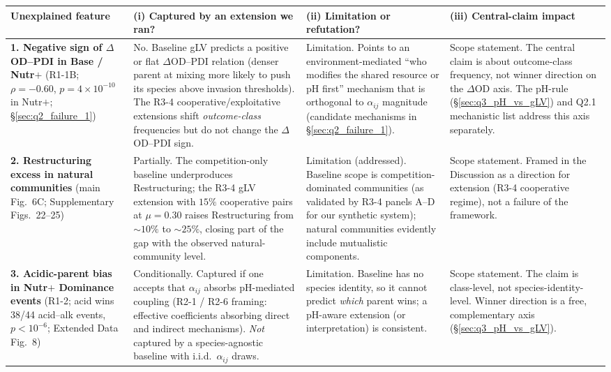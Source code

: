 \documentclass[11pt]{article}
\begin{document}
\begin{center}
\small
\begin{tabular}{p{} p{} p{} p{}}
\toprule
\textbf{Unexplained feature} & \textbf{(i) Captured by an extension we ran?} & \textbf{(ii) Limitation or refutation?} & \textbf{(iii) Central-claim impact} \\
\midrule
\textbf{1. Negative sign of $\Delta$OD--PDI in Base / Nutr$+$} \newline (R1-1B; $\rho = -0.60$, $p = 4 \times 10^{-10}$ in Nutr$+$; \S\ref{sec:q2_failure_1}) &
No. Baseline gLV predicts a positive or flat $\Delta$OD--PDI relation (denser parent at mixing more likely to push its species above invasion thresholds). The R3-4 cooperative/exploitative extensions shift \emph{outcome-class} frequencies but do not change the $\Delta$OD--PDI sign. &
Limitation. Points to an environment-mediated ``who modifies the shared resource or pH first'' mechanism that is orthogonal to $\alpha_{ij}$ magnitude (candidate mechanisms in \S\ref{sec:q2_failure_1}). &
Scope statement. The central claim is about outcome-class frequency, not winner direction on the $\Delta$OD axis. The pH-rule (\S\ref{sec:q3_pH_vs_gLV}) and Q2.1 mechanistic list address this axis separately. \\

\textbf{2. Restructuring excess in natural communities} \newline (main Fig.~6C; Supplementary Figs.~22--25) &
Partially. The competition-only baseline underproduces Restructuring; the R3-4 gLV extension with $15\%$ cooperative pairs at $\mu = 0.30$ raises Restructuring from $\sim 10\%$ to $\sim 25\%$, closing part of the gap with the observed natural-community level. &
Limitation (addressed). Baseline scope is competition-dominated communities (as validated by R3-4 panels A--D for our synthetic system); natural communities evidently include mutualistic components. &
Scope statement. Framed in the Discussion as a direction for extension (R3-4 cooperative regime), not a failure of the framework. \\

\textbf{3. Acidic-parent bias in Nutr$+$ Dominance events} \newline (R1-2; acid wins 38/44 acid--alk events, $p < 10^{-6}$; Extended Data Fig.~8) &
Conditionally. Captured if one accepts that $\alpha_{ij}$ absorbs pH-mediated coupling (R2-1 / R2-6 framing: effective coefficients absorbing direct and indirect mechanisms). \emph{Not} captured by a species-agnostic baseline with i.i.d.\ $\alpha_{ij}$ draws. &
Limitation. Baseline has no species identity, so it cannot predict \emph{which} parent wins; a pH-aware extension (or interpretation) is consistent. &
Scope statement. The claim is class-level, not species-identity-level. Winner direction is a free, complementary axis (\S\ref{sec:q3_pH_vs_gLV}). \\


\end{tabular}
\end{center}
\end{document}

